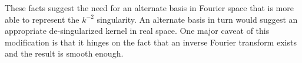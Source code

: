 \documentclass[letterpaper,10pt]{article}
\begin{document}
These facts suggest the need for an alternate basis in Fourier space that is more able to represent the $k^{-2}$ singularity. An alternate basis in turn would suggest an appropriate de-singularized kernel in real space. One major caveat of this modification is that it hinges on the fact that an inverse Fourier transform exists and the result is smooth enough.
\end{document}
